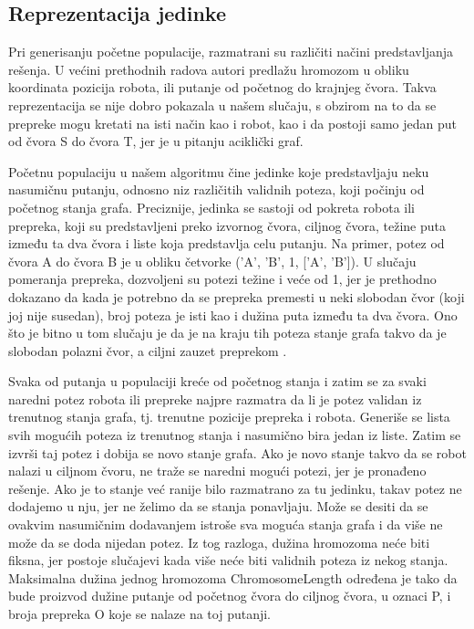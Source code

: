 \documentclass[12pt]{article}
\begin{document}
	\subsection{Reprezentacija jedinke}
	\label{subsec:podnaslov1}
	Pri generisanju početne populacije, razmatrani su različiti načini predstavljanja rešenja. U većini prethodnih radova autori predlažu hromozom u obliku koordinata pozicija robota, ili putanje od početnog do krajnjeg čvora. 
	Takva reprezentacija se nije dobro pokazala u našem slučaju, s obzirom na to da se prepreke mogu kretati na isti način kao i robot, kao i da postoji samo jedan put od čvora S do čvora T, jer je u pitanju aciklički graf.
	\par Početnu populaciju u našem algoritmu čine jedinke koje predstavljaju neku nasumičnu putanju, odnosno niz različitih validnih poteza, koji počinju od početnog stanja grafa. Preciznije, jedinka se sastoji od pokreta robota ili prepreka, koji su predstavljeni preko izvornog čvora, ciljnog čvora, težine puta između ta dva čvora i liste koja predstavlja celu putanju. Na primer, potez od čvora A do čvora B je u obliku četvorke ('A', 'B', 1, ['A', 'B']). U slučaju pomeranja prepreka, dozvoljeni su potezi težine i veće od 1, jer je prethodno dokazano da kada je potrebno da se prepreka premesti u neki slobodan čvor (koji joj nije susedan), broj poteza je isti kao i dužina puta između ta dva čvora. Ono što je bitno u tom slučaju je da je na kraju tih poteza stanje grafa takvo da je slobodan polazni čvor, a ciljni zauzet preprekom \cite{glavni}.
	\par Svaka od putanja u populaciji kreće od početnog stanja i zatim se za svaki naredni potez robota ili prepreke najpre razmatra da li je potez validan iz trenutnog stanja grafa, tj. trenutne pozicije prepreka i robota. Generiše se lista svih mogućih poteza iz trenutnog stanja i nasumično bira jedan iz liste. Zatim se izvrši taj potez i dobija se novo stanje grafa. Ako je novo stanje takvo da se robot nalazi u ciljnom čvoru, ne traže se naredni mogući potezi, jer je pronađeno rešenje. Ako je to stanje već ranije bilo razmatrano za tu jedinku, takav potez ne dodajemo u nju, jer ne želimo da se stanja ponavljaju. Može se desiti da se ovakvim nasumičnim dodavanjem istroše sva moguća stanja grafa i da više ne može da se doda nijedan potez.
	Iz tog razloga, dužina hromozoma neće biti fiksna, jer postoje slučajevi kada više neće biti validnih poteza iz nekog stanja. Maksimalna dužina jednog hromozoma ChromosomeLength određena je tako da bude proizvod dužine putanje od početnog čvora do ciljnog čvora, u oznaci P, i broja prepreka O koje se nalaze na toj putanji. \newline
	
\end{document}
